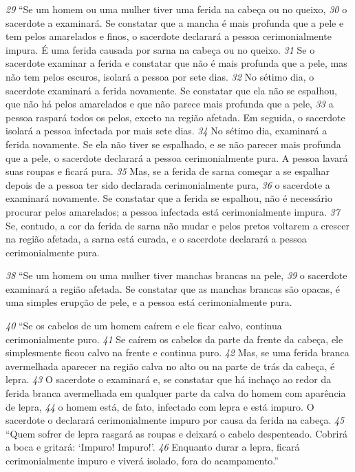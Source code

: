 \bigskip 
\textit{\tiny 29}
“Se um homem ou uma mulher tiver uma ferida na cabeça ou no queixo, 
\textit{\tiny 30}
o
sacerdote a examinará. Se constatar que a mancha é mais profunda que a pele e
tem pelos amarelados e finos, o sacerdote declarará a pessoa cerimonialmente
impura. É uma ferida causada por sarna na cabeça ou no queixo. 
\textit{\tiny 31}
Se o sacerdote
examinar a ferida e constatar que não é mais profunda que a pele, mas não tem
pelos escuros, isolará a pessoa por sete dias. 
\textit{\tiny 32}
No sétimo dia, o sacerdote
examinará a ferida novamente. Se constatar que ela não se espalhou, que não há
pelos amarelados e que não parece mais profunda que a pele, 
\textit{\tiny 33}
a pessoa raspará
todos os pelos, exceto na região afetada. Em seguida, o sacerdote isolará a pessoa
infectada por mais sete dias. 
\textit{\tiny 34}
No sétimo dia, examinará a ferida novamente. Se
ela não tiver se espalhado, e se não parecer mais profunda que a pele, o sacerdote
declarará a pessoa cerimonialmente pura. A pessoa lavará suas roupas e ficará
pura. 
\textit{\tiny 35}
Mas, se a ferida de sarna começar a se espalhar depois de a pessoa ter sido
declarada cerimonialmente pura, 
\textit{\tiny 36}
o sacerdote a examinará novamente. Se
constatar que a ferida se espalhou, não é necessário procurar pelos amarelados; a
pessoa infectada está cerimonialmente impura. 
\textit{\tiny 37}
Se, contudo, a cor da ferida de
sarna não mudar e pelos pretos voltarem a crescer na região afetada, a sarna está
curada, e o sacerdote declarará a pessoa cerimonialmente pura.
   
\bigskip 
\textit{\tiny 38}
“Se um homem ou uma mulher tiver manchas brancas na pele, 
\textit{\tiny 39}
o sacerdote
examinará a região afetada. Se constatar que as manchas brancas são opacas, é
uma simples erupção de pele, e a pessoa está cerimonialmente pura.
   
\bigskip 
\textit{\tiny 40}
“Se os cabelos de um homem caírem e ele ficar calvo, continua
cerimonialmente puro. 
\textit{\tiny 41}
Se caírem os cabelos da parte da frente da cabeça, ele
simplesmente ficou calvo na frente e continua puro. 
\textit{\tiny 42}
Mas, se uma ferida branca
avermelhada aparecer na região calva no alto ou na parte de trás da cabeça, é
lepra. 
\textit{\tiny 43}
O sacerdote o examinará e, se constatar que há inchaço ao redor da ferida
branca avermelhada em qualquer parte da calva do homem com aparência de
lepra, 
\textit{\tiny 44}
o homem está, de fato, infectado com lepra e está impuro. O sacerdote o
declarará cerimonialmente impuro por causa da ferida na cabeça.
\textit{\tiny 45}
“Quem sofrer de lepra rasgará as roupas e deixará o cabelo despenteado.
Cobrirá a boca e gritará: ‘Impuro! Impuro!’. 
\textit{\tiny 46}
Enquanto durar a lepra, ficará
cerimonialmente impuro e viverá isolado, fora do acampamento.”


